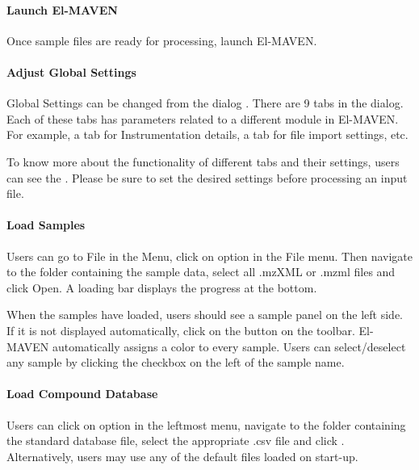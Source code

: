 \documentclass[letterpaper,10pt,english,openany,oneside]{sphinxmanual}
\begin{document}
\paragraph{Launch El-MAVEN}
\label{\detokenize{LabeledLCMSMSWorkflow:launch-el-maven}}
Once sample files are ready for processing, launch El-MAVEN.



\paragraph{Adjust Global Settings}
\label{\detokenize{LabeledLCMSMSWorkflow:adjust-global-settings}}
Global Settings can be changed from the  dialog . There are 9 tabs in the dialog. Each of these tabs has parameters related to a different module in El-MAVEN. For example, a tab for Instrumentation details, a tab for file import settings, etc.


To know more about the functionality of different tabs and their settings, users can see the . Please be sure to set the desired settings before processing an input file.


\paragraph{Load Samples}
\label{\detokenize{LabeledLCMSMSWorkflow:load-samples}}
Users can go to File in the Menu, click on  option in the File menu. Then navigate to the folder containing the sample data, select all .mzXML or .mzml files and click Open. A loading bar displays the progress at the bottom.


When the samples have loaded, users should see a sample panel on the left side. If it is not displayed automatically, click on the  button on the toolbar. El-MAVEN automatically assigns a color to every sample. Users can select/deselect any sample by clicking the checkbox on the left of the sample name.



\paragraph{Load Compound Database}
\label{\detokenize{LabeledLCMSMSWorkflow:load-compound-database}}
Users can click on  option in the leftmost menu, navigate to the folder containing the standard database file, select the appropriate .csv file and click . Alternatively, users may use any of the default files loaded on start-up.
\end{document}
